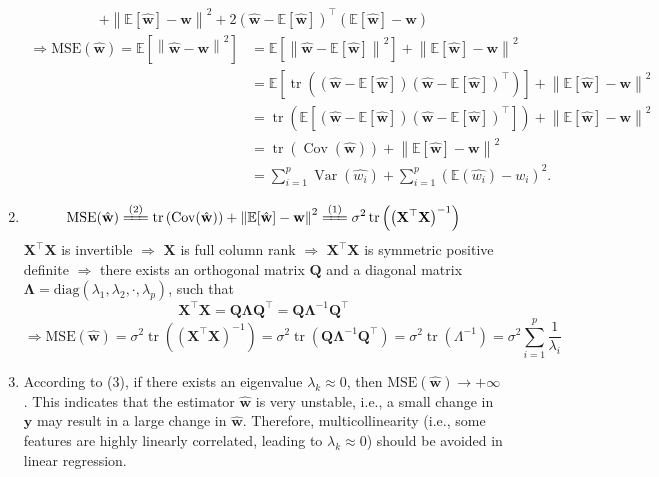 \documentclass[11pt,letter,notitlepage]{article}
\begin{document}
\begin{solution}
\begin{enumerate}
\begin{align*}
	+ 
	\left\|\mathbb{E}[\hat{\mathbf{w}}] - \mathbf{w}\right\|^2
	+
	2\left(\hat{\mathbf{w}} - \mathbb{E}[\hat{\mathbf{w}}]\right)^{\top}\left(\mathbb{E}[\hat{\mathbf{w}}] - \mathbf{w}\right)
	\end{align*}
	\begin{align*}
	\Longrightarrow
	\text{MSE}(\hat{\mathbf{w}})
	=
	\mathbb{E}[\left\|\hat{\mathbf{w}} - \mathbf{w}\right\|^2]
	&=
	\mathbb{E}[\left\| \hat{\mathbf{w}} - \mathbb{E}[\hat{\mathbf{w}}]\right\|^2] + \left\|\mathbb{E}[\hat{\mathbf{w}}] - \mathbf{w}\right\|^2\\
	&=
	\mathbb{E}\left[\operatorname{tr}\left((\hat{\mathbf{w}} - \mathbb{E}[\hat{\mathbf{w}}]) (\hat{\mathbf{w}} - \mathbb{E}[\hat{\mathbf{w}}])^\top\right)\right] + \left\|\mathbb{E}[\hat{\mathbf{w}}] - \mathbf{w}\right\|^2\\
	&=
	\operatorname{tr}\left(\mathbb{E}\left[(\hat{\mathbf{w}} - \mathbb{E}[\hat{\mathbf{w}}]) (\hat{\mathbf{w}} - \mathbb{E}[\hat{\mathbf{w}}])^\top\right]\right) + \left\|\mathbb{E}[\hat{\mathbf{w}}] - \mathbf{w}\right\|^2\\
	&= \operatorname{tr}\left(\operatorname{Cov}(\hat{\mathbf{w}})\right) + \left\|\mathbb{E}[\hat{\mathbf{w}}]-\mathbf{w}\right\|^2\\
	&=\sum_{i=1}^{p} \operatorname{Var}(\hat{w_i}) + \sum_{i=1}^{p}  (\mathbb{E} (\hat{w_i})-w_i)^2.
	\end{align*}
	\item 
	\[
	\text{MSE}(\hat{\mathbf{w}})
	\xlongequal{(2)}
	\operatorname{tr}\left(\operatorname{Cov}(\hat{\mathbf{w}})\right) + \left\|\mathbb{E}[\hat{\mathbf{w}}]-\mathbf{w}\right\|^2
	\xlongequal{(1)}
	\sigma^2 \operatorname{tr}\left(\left(\mathbf{X}^{\top} \mathbf{X}\right)^{-1}\right)
	\]
	$\mathbf{X}^{\top}\mathbf{X}$ is invertible $\Longrightarrow$ $\mathbf{X}$ is full column rank $\Longrightarrow$ $\mathbf{X}^{\top} \mathbf{X}$ is symmetric positive definite $\Longrightarrow$ there exists an orthogonal matrix $\mathbf{Q}$ and a diagonal matrix $\mathbf{\Lambda} = \text{diag}(\lambda_1, \lambda_2, \cdot, \lambda_p)$, such that
	\[
	\mathbf{X}^{\top} \mathbf{X}
	=
	\mathbf{Q} \mathbf{\Lambda} \mathbf{Q}^\top
	=
	\mathbf{Q} \mathbf{\Lambda}^{-1} \mathbf{Q}^\top
	\]
	\[
	\Longrightarrow
	\text{MSE}(\hat{\mathbf{w}})
	=
	\sigma^2 \operatorname{tr}\left(\left(\mathbf{X}^{\top} \mathbf{X}\right)^{-1}\right)
	=
	\sigma^2 \operatorname{tr}\left(\mathbf{Q} \mathbf{\Lambda}^{-1} \mathbf{Q}^\top\right)
	=
	\sigma^2 \operatorname{tr}(\Lambda^{-1})
	=
	\sigma^2 \sum_{i=1}^{p} \frac{1}{\lambda_i}
	\]
	\item 
	According to (3), if there exists an eigenvalue $\lambda_k \approx 0$, then $\text{MSE}(\hat{\mathbf{w}}) \to +\infty$. This indicates that the estimator $\hat{\mathbf{w}}$ is very unstable, i.e., a small change in $\mathbf{y}$ may result in a large change in $\hat{\mathbf{w}}$. Therefore, multicollinearity (i.e., some features are highly linearly correlated, leading to $\lambda_k \approx 0$) should be avoided in linear regression.
\end{enumerate}
\end{solution}
\end{document}
